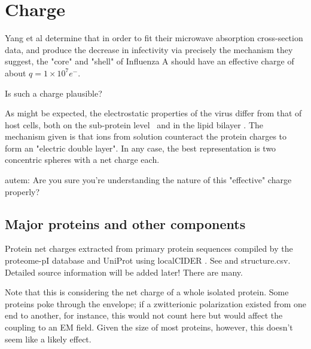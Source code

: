\documentclass[paper.tex]{subfiles}
\begin{document}
\section{Charge}

Yang et al determine that in order to fit their microwave absorption cross-section data, and produce the decrease in infectivity via precisely the mechanism they suggest, the "core" and "shell" of Influenza A should have an effective charge of about $q=1 \times 10^7 e^-$. 

Is such a charge plausible? 

As might be expected, the electrostatic properties of the virus differ from that of host cells, both on the sub-protein level\cite{Icosahedral2019} \footnotemark \ and in the lipid bilayer \cite{Lipid2015} \footnotemark. The mechanism given is that ions from solution counteract the protein charges to form an "electric double layer". In any case, the best representation is two concentric spheres with a net charge each.



\begin{autem}
	autem: Are you sure you're understanding the nature of this "effective" charge properly?
\end{autem}

\subsection{Major proteins and other components}

Protein net charges extracted from primary protein sequences compiled by the proteome-pI database \cite{ProteomepI2017} and UniProt using localCIDER \cite{CIDER2017}. See  and structure.csv. Detailed source information will be added later! There are many.

Note that this is considering the net charge of a whole isolated protein. Some proteins poke through the envelope; if a zwitterionic polarization existed from one end to another, for instance, this would not count here but would affect the coupling to an EM field. Given the size of most proteins, however, this doesn't seem like a likely effect.
\end{document}

